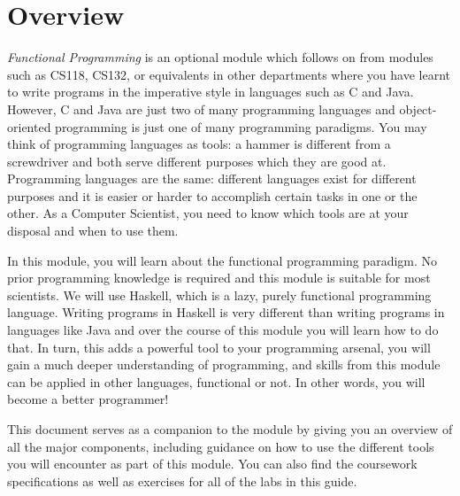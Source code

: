 \chapter{Overview}

\emph{Functional Programming} is an optional module which follows on from modules such as CS118, CS132, or equivalents in other departments where you have learnt to write programs in the imperative style in languages such as C and Java. However, C and Java are just two of many programming languages and object-oriented programming is just one of many programming paradigms. You may think of programming languages as tools: a hammer is different from a screwdriver and both serve different purposes which they are good at. Programming languages are the same: different languages exist for different purposes and it is easier or harder to accomplish certain tasks in one or the other. As a Computer Scientist, you need to know which tools are at your disposal and when to use them.

In this module, you will learn about the functional programming paradigm. No prior programming knowledge is required and this module is suitable for most scientists. We will use Haskell, which is a lazy, purely functional programming language. Writing programs in Haskell is very different than writing programs in languages like Java and over the course of this module you will learn how to do that. In turn, this adds a powerful tool to your programming arsenal, you will gain a much deeper understanding of programming, and skills from this module can be applied in other languages, functional or not. In other words, you will become a better programmer!

This document serves as a companion to the module by giving you an overview of all the major components, including guidance on how to use the different tools you will encounter as part of this module. You can also find the coursework specifications as well as exercises for all of the labs in this guide.